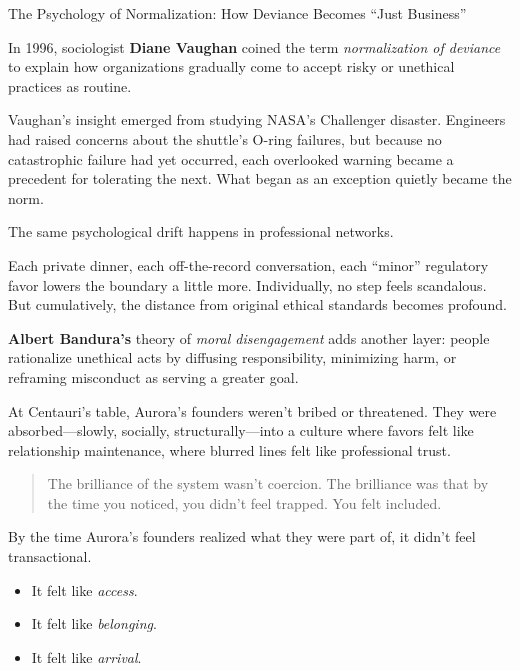 \begin{PsychologySidebar}{The Psychology of Normalization: How Deviance Becomes “Just Business”}

  In 1996, sociologist \textbf{Diane Vaughan} coined the term \emph{normalization of deviance} to explain how organizations gradually come to accept risky or unethical practices as routine.

  \medskip
  
  Vaughan’s insight emerged from studying NASA’s Challenger disaster. Engineers had raised concerns about the shuttle’s O-ring failures, but because no catastrophic failure had yet occurred, each overlooked warning became a precedent for tolerating the next. What began as an exception quietly became the norm.

  \medskip
  
  The same psychological drift happens in professional networks.

  \medskip
  
  Each private dinner, each off-the-record conversation, each “minor” regulatory favor lowers the boundary a little more. Individually, no step feels scandalous. But cumulatively, the distance from original ethical standards becomes profound.

  \medskip
  
  \textbf{Albert Bandura’s} theory of \emph{moral disengagement} adds another layer: people rationalize unethical acts by diffusing responsibility, minimizing harm, or reframing misconduct as serving a greater goal.

  \medskip
  
  At Centauri’s table, Aurora’s founders weren’t bribed or threatened. They were absorbed—slowly, socially, structurally—into a culture where favors felt like relationship maintenance, where blurred lines felt like professional trust.
  
  \begin{quote}
  The brilliance of the system wasn’t coercion.  The brilliance was that by the time you noticed, you didn’t feel trapped.  You felt included.
  \end{quote}
  
\end{PsychologySidebar}

\medskip

By the time Aurora’s founders realized what they were part of, it didn’t feel transactional.

\begin{itemize}
  \item It felt like \textit{access}.
  \item It felt like \textit{belonging}.
  \item It felt like \textit{arrival}.
\end{itemize}

